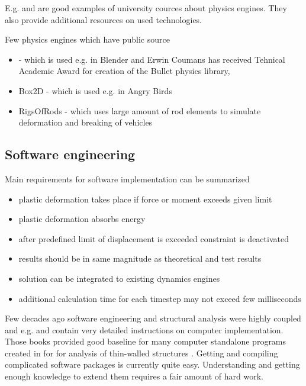 E.g. \cite{cornell.cs3152} and \cite{cornell.cs5643} are good examples of  university cources
about physics engines. They also provide additional resources on used technologies.

Few physics engines which have public source

\begin{itemize}
\item \bullet - \cite{bullet} which is used e.g. in Blender and Erwin Coumans
 has received Tehnical Academic Award for creation of the Bullet physics library, \cite{erwin.oscar}
\item Box2D - \cite{box2d} which is used e.g. in Angry Birds
\item RigsOfRods - \cite{ror} which uses large amount of rod elements to simulate deformation and breaking of vehicles
\end{itemize}


\subsection{Software engineering}

Main requirements for software implementation can be summarized
\begin{itemize}
\item plastic deformation takes place if force or moment exceeds given limit
\item plastic deformation absorbs energy
\item after predefined limit of displacement is exceeded constraint is deactivated 
\item results should be in same magnitude as theoretical and test results
\item solution can be integrated to existing dynamics engines
\item additional calculation time for each timestep may not exceed few milliseconds 
\end{itemize}

Few decades ago software engineering and structural analysis were highly coupled
and e.g. \cite{bathe} and \cite{cook} contain very detailed instructions on
computer implementation. Those books provided good baseline for many computer 
standalone programs created in \lut for for analysis of 
thin-walled structures \cite{agifap,fsm,vtb}.  
Getting and compiling complicated software packages is currently quite easy. 
Understanding and getting enough knowledge to extend them requires a fair amount of hard work.

